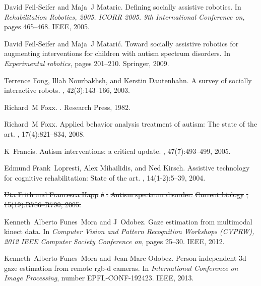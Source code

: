 \documentclass{ut-thesis}
\providecommand{\DIFdeltex}[1]{{\protect\color{red}\sout{#1}}}                      %
\providecommand{\DIFaddend}{} %
\providecommand{\DIFdelbegin}{} %
\providecommand{\DIFdelend}{} %
\providecommand{\DIFdel}[1]{\texorpdfstring{\DIFdeltex{#1}}{}} %
\begin{document}
\begin{thebibliography}{100}
\DIFaddend {}
David Feil-Seifer and Maja~J Mataric.
\newblock Defining socially assistive robotics.
\newblock In {\em Rehabilitation Robotics, 2005. ICORR 2005. 9th International
  Conference on}, pages 465--468. IEEE, 2005.

David Feil-Seifer and Maja~J Matari{\'c}.
\newblock Toward socially assistive robotics for augmenting interventions for
  children with autism spectrum disorders.
\newblock In {\em Experimental robotics}, pages 201--210. Springer, 2009.

Terrence Fong, Illah Nourbakhsh, and Kerstin Dautenhahn.
\newblock A survey of socially interactive robots.
, 42(3):143--166, 2003.

Richard~M Foxx.
.
\newblock Research Press, 1982.

Richard~M Foxx.
\newblock Applied behavior analysis treatment of autism: The state of the art.
,
  17(4):821--834, 2008.

K~Francis.
\newblock Autism interventions: a critical update.
, 47(7):493--499,
  2005.

Edmund Frank~Lopresti, Alex Mihailidis, and Ned Kirsch.
\newblock Assistive technology for cognitive rehabilitation: State of the art.
, 14(1-2):5--39, 2004.

\DIFdelbegin %
\DIFdel{Uta Frith and Francesca Happ}%
\DIFdel{\'e}%
\DIFdel{.
}%
\DIFdel{Autism spectrum disorder.
}%
\DIFdel{Current biology}%
\DIFdel{, 15(19):R786--R790, 2005.
}%

\DIFdelend {}
Kenneth~Alberto Funes~Mora and J~Odobez.
\newblock Gaze estimation from multimodal kinect data.
\newblock In {\em Computer Vision and Pattern Recognition Workshops (CVPRW),
  2012 IEEE Computer Society Conference on}, pages 25--30. IEEE, 2012.

Kenneth~Alberto Funes~Mora and Jean-Marc Odobez.
\newblock Person independent 3d gaze estimation from remote rgb-d cameras.
\newblock In {\em International Conference on Image Processing}, number
  EPFL-CONF-192423. IEEE, 2013.


\end{thebibliography}
\end{document}
